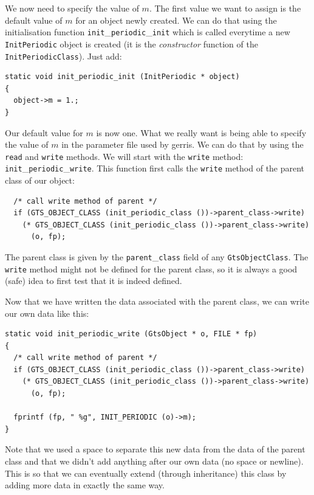 \documentclass[a4paper]{article}
\begin{document}
We now need to specify the value of $m$. The first value we want to
assign is the default value of $m$ for an object newly created. We can
do that using the initialisation function {\tt init}\_{\tt periodic}\_{\tt init}
which is called everytime a new {\tt InitPeriodic} object is created
(it is the {\em constructor} function of the {\tt
InitPeriodicClass}). Just add:
\begin{verbatim}
static void init_periodic_init (InitPeriodic * object)
{
  object->m = 1.;
}
\end{verbatim}
Our default value for $m$ is now one. What we really want is being
able to specify the value of $m$ in the parameter file used by
gerris. We can do that by using the {\tt read} and {\tt write}
methods. We will start with the {\tt write} method: {\tt
init}\_{\tt periodic}\_{\tt write}. This function first calls the {\tt write} method 
of the parent class of our object:
\begin{verbatim}
  /* call write method of parent */
  if (GTS_OBJECT_CLASS (init_periodic_class ())->parent_class->write)
    (* GTS_OBJECT_CLASS (init_periodic_class ())->parent_class->write) 
      (o, fp);
\end{verbatim}
The parent class is given by the
{\tt parent}\_{\tt class} field of any {\tt GtsObjectClass}. The {\tt write}
method might not be defined for the parent class, so it is always a
good (safe) idea to first test that it is indeed defined.

Now that we have written the data associated with the parent class, we 
can write our own data like this:
\begin{verbatim}
static void init_periodic_write (GtsObject * o, FILE * fp)
{
  /* call write method of parent */
  if (GTS_OBJECT_CLASS (init_periodic_class ())->parent_class->write)
    (* GTS_OBJECT_CLASS (init_periodic_class ())->parent_class->write) 
      (o, fp);

  fprintf (fp, " %g", INIT_PERIODIC (o)->m);
}
\end{verbatim}
Note that we used a space to separate this new data from the data of
the parent class and that we didn't add anything after our own data
(no space or newline). This is so that we can eventually extend
(through inheritance) this class by adding more data in exactly the
same way.
\end{document}

